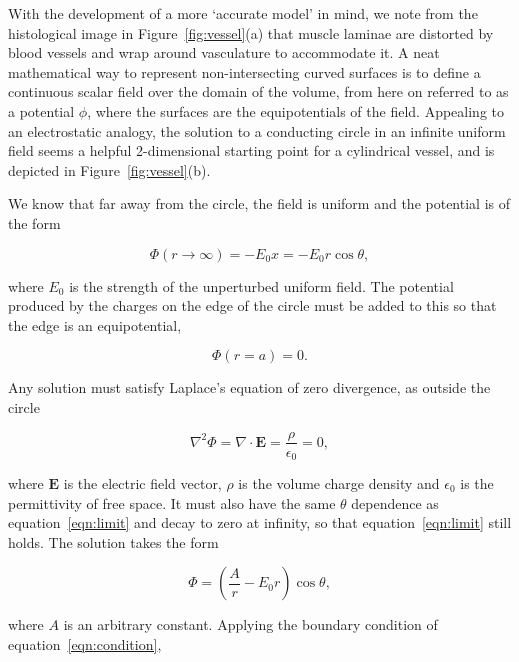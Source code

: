   With the development of a more `accurate model' in mind, we note from the histological image in Figure~\ref{fig:vessel}(a) that muscle laminae are distorted by blood vessels and wrap around vasculature to accommodate it. A neat mathematical way to represent non-intersecting curved surfaces is to define a continuous scalar field over the domain of the volume, from here on referred to as a potential $\phi$, where the surfaces are the equipotentials of the field. Appealing to an electrostatic analogy, the solution to a conducting circle in an infinite uniform field seems a helpful 2-dimensional starting point for a cylindrical vessel, and is depicted in Figure~\ref{fig:vessel}(b).
  
  We know that far away from the circle, the field is uniform and the potential is of the form
  
  \begin{equation}
    \Phi(r\rightarrow\infty) = -E_0x = -E_0r\cos\theta,
    \label{eqn:limit}
  \end{equation}
  
  where $E_0$ is the strength of the unperturbed uniform field. The potential produced by the charges on the edge of the circle must be added to this so that the edge is an equipotential,
  
  \begin{equation}
    \Phi(r=a) = 0.
    \label{eqn:condition}
  \end{equation}
  
  Any solution must satisfy Laplace’s equation of zero divergence, as outside the circle
  
  \begin{equation}
    \nabla^2\Phi = \nabla\cdot\mathbf{E} = \frac{\rho}{\epsilon_0} = 0,
  \end{equation}
  
  where $\mathbf{E}$ is the electric field vector, $\rho$ is the volume charge density and $\epsilon_0$ is the permittivity of free space. It must also have the same $\theta$ dependence as equation~\ref{eqn:limit} and decay to zero at infinity, so that equation~\ref{eqn:limit} still holds. The solution takes the form
  
  \begin{equation}
    \Phi = \left(\frac{A}{r} - E_0r\right)\cos\theta,
  \end{equation}
  
  where $A$ is an arbitrary constant. Applying the boundary condition of equation~\ref{eqn:condition},
  
